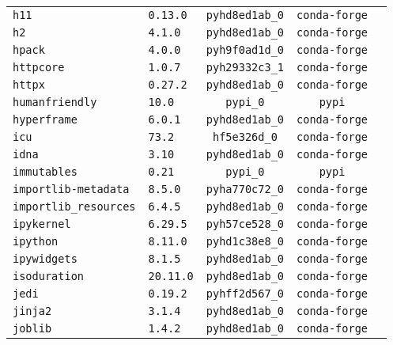 \begin{longtable}{p{}|l|ccc}
\texttt{h11}              & \texttt{0.13.0}      & \texttt{pyhd8ed1ab\_0}   & \texttt{conda-forge}\\
\texttt{h2}               & \texttt{4.1.0}       & \texttt{pyhd8ed1ab\_0}   & \texttt{conda-forge}\\
\texttt{hpack}            & \texttt{4.0.0}       & \texttt{pyh9f0ad1d\_0}   & \texttt{conda-forge}\\
\texttt{httpcore}         & \texttt{1.0.7}       & \texttt{pyh29332c3\_1}   & \texttt{conda-forge}\\
\texttt{httpx}            & \texttt{0.27.2}      & \texttt{pyhd8ed1ab\_0}   & \texttt{conda-forge}\\
\texttt{humanfriendly}    & \texttt{10.0}        & \texttt{pypi\_0}         & \texttt{pypi}\\
\texttt{hyperframe}       & \texttt{6.0.1}       & \texttt{pyhd8ed1ab\_0}   & \texttt{conda-forge}\\
\texttt{icu}              & \texttt{73.2}        & \texttt{hf5e326d\_0}    & \texttt{conda-forge}\\
\texttt{idna}             & \texttt{3.10}        & \texttt{pyhd8ed1ab\_0}   & \texttt{conda-forge}\\
\texttt{immutables}       & \texttt{0.21}        & \texttt{pypi\_0}         & \texttt{pypi}\\
\texttt{importlib-metadata} & \texttt{8.5.0}    & \texttt{pyha770c72\_0}   & \texttt{conda-forge}\\
\texttt{importlib\_resources} & \texttt{6.4.5}  & \texttt{pyhd8ed1ab\_0}   & \texttt{conda-forge}\\
\texttt{ipykernel}        & \texttt{6.29.5}      & \texttt{pyh57ce528\_0}   & \texttt{conda-forge}\\
\texttt{ipython}          & \texttt{8.11.0}      & \texttt{pyhd1c38e8\_0}   & \texttt{conda-forge}\\
\texttt{ipywidgets}       & \texttt{8.1.5}       & \texttt{pyhd8ed1ab\_0}   & \texttt{conda-forge}\\
\texttt{isoduration}      & \texttt{20.11.0}     & \texttt{pyhd8ed1ab\_0}   & \texttt{conda-forge}\\
\texttt{jedi}             & \texttt{0.19.2}      & \texttt{pyhff2d567\_0}   & \texttt{conda-forge}\\
\texttt{jinja2}           & \texttt{3.1.4}       & \texttt{pyhd8ed1ab\_0}   & \texttt{conda-forge}\\
\texttt{joblib}           & \texttt{1.4.2}       & \texttt{pyhd8ed1ab\_0}   & \texttt{conda-forge}\\

\end{longtable}
